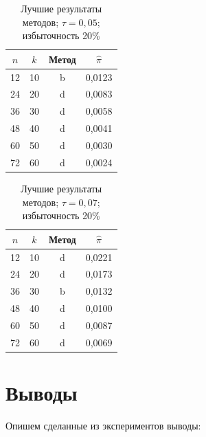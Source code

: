 \begin{table}
\begin{center}
    \begin{tabular}{|c|c|c|c|}
        \hline
        $n$ & $k$ & Метод & $\hat\pi$ \\
        \hline
        12 & 10 & b & 0{,}0123 \\
        \hline
        24 & 20 & d & 0{,}0083 \\
        \hline
        36 & 30 & d & 0{,}0058 \\
        \hline
        48 & 40 & d & 0{,}0041 \\
        \hline
        60 & 50 & d & 0{,}0030 \\ 
        \hline
        72 & 60 & d & 0{,}0024 \\
        \hline
    \end{tabular}
    \caption{Лучшие результаты методов; $\tau=0{,}05$; избыточность 20\%}
\end{center}
\end{table}

\begin{table}
\begin{center}
    \begin{tabular}{|c|c|c|c|}
        \hline
        $n$ & $k$ & Метод & $\hat\pi$ \\
        \hline
        12 & 10 & d & 0{,}0221 \\
        \hline
        24 & 20 & d & 0{,}0173 \\
        \hline
        36 & 30 & b & 0{,}0132 \\
        \hline
        48 & 40 & d & 0{,}0100 \\
        \hline
        60 & 50 & d & 0{,}0087 \\ 
        \hline
        72 & 60 & d & 0{,}0069 \\
        \hline
    \end{tabular}
    \caption{Лучшие результаты методов; $\tau=0{,}07$; избыточность 20\%}
\end{center}
\end{table}

\section{Выводы}

Опишем сделанные из экспериментов выводы:

